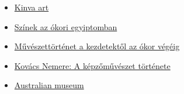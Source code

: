 \begin{itemize}
	\item \href{https://www.kinvaart.hu/1-lecke-muveszettortenet-ingyenes-online-festeszeti-tanfolyam/}{Kinva art}
	\item \href{https://www.kfki.hu/~cheminfo/hun/teazo/uj/szin.html}{Színek az ókori egyiptomban}
	
	\item 
	\href{http://aktivitas-tiszk.hu/elearning/Bergendi_Rita/Okor.pdf}{Művészettörténet a kezdetektől az ókor végéig}
	
	\item 
	\href{http://mek.oszk.hu/14000/14064/14064.pdf}{Kovács Nemere: A képzőművészet története}
	
	\item
	\href{https://australian.museum/learn/cultures/international-collection/ancient-egyptian/the-painter-in-ancient-egypt/}{Australian museum}
\end{itemize}




